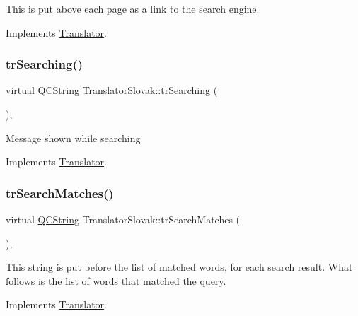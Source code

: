 This is put above each page as a link to the search engine. 

Implements \mbox{\hyperlink{class_translator}{Translator}}.

\mbox{\label{class_translator_slovak_a1913e5c3ceb2d0b542d68420182f95b0}} 
\subsubsection{\texorpdfstring{trSearching()}{trSearching()}}
{\footnotesize\ttfamily virtual \mbox{\hyperlink{class_q_c_string}{Q\+C\+String}} Translator\+Slovak\+::tr\+Searching (\begin{DoxyParamCaption}{ }\end{DoxyParamCaption})\hspace{0.3cm}{\ttfamily [inline]}, {\ttfamily [virtual]}}

Message shown while searching 

Implements \mbox{\hyperlink{class_translator}{Translator}}.

\mbox{\label{class_translator_slovak_abfdd9a52479501cf2f75d97001fe52ac}} 
\subsubsection{\texorpdfstring{trSearchMatches()}{trSearchMatches()}}
{\footnotesize\ttfamily virtual \mbox{\hyperlink{class_q_c_string}{Q\+C\+String}} Translator\+Slovak\+::tr\+Search\+Matches (\begin{DoxyParamCaption}{ }\end{DoxyParamCaption})\hspace{0.3cm}{\ttfamily [inline]}, {\ttfamily [virtual]}}

This string is put before the list of matched words, for each search result. What follows is the list of words that matched the query. 

Implements \mbox{\hyperlink{class_translator}{Translator}}.

\mbox{\label{class_translator_slovak_a199b6973cb4fd1e571425cdd0ee04608}} 
